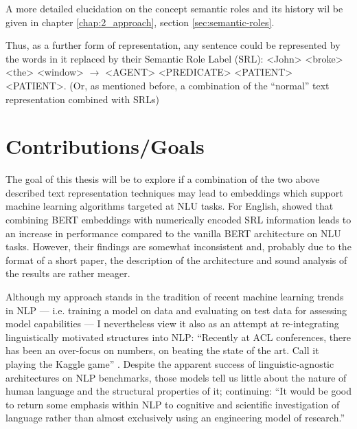 A more detailed elucidation on the concept semantic roles and its history wil be
given in chapter \ref{chap:2_approach}, section \ref{sec:semantic-roles}.

Thus, as a further form of representation, any sentence could be represented by the words in it
replaced by their Semantic Role Label (SRL): <John> <broke> <the> <window> $\rightarrow$ <AGENT>
<PREDICATE> <PATIENT> <PATIENT>. (Or, as mentioned before, a combination of the ``normal'' text
representation combined with SRLs)




\section{Contributions/Goals}

The goal of this thesis will be to explore if a combination of the two above described text
representation techniques may lead to embeddings which support machine learning algorithms
targeted at NLU tasks. For English, \cite{zhang2019semantics} showed that combining BERT
embeddings with numerically encoded SRL information leads to an increase in performance
compared to the vanilla BERT architecture on NLU tasks. However, their findings are somewhat
inconsistent and, probably due to the format of a short paper, the description of the
architecture and sound analysis of the results are {\color{red} rather meager.}

Although my approach stands in the tradition of recent machine learning trends in NLP --- i.e.
training a model on data and evaluating on test data for assessing model capabilities --- I
nevertheless view it also as an attempt at re-integrating linguistically motivated structures
into NLP: ``Recently at ACL conferences, there has been an over-focus on numbers, on beating the
state of the art. Call it playing the Kaggle game'' \citep[p.~702]{manning2015computational}.
Despite the apparent success of linguistic-agnostic architectures on NLP benchmarks, those
models tell us little about the nature of human language and the structural properties of it;
\citeauthor{manning2015computational} continuing: ``It would be good to return some emphasis
within NLP to cognitive and scientific investigation of language rather than almost exclusively
using an engineering model of research.''

